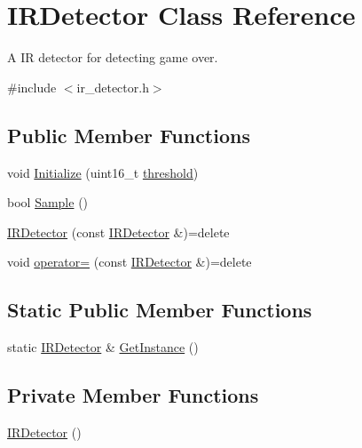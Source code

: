 \hypertarget{class_i_r_detector}{}\section{I\+R\+Detector Class Reference}
\label{class_i_r_detector}


A IR detector for detecting game over.  




{\ttfamily \#include $<$ir\+\_\+detector.\+h$>$}

\subsection*{Public Member Functions}
\begin{DoxyCompactItemize}
\item 
void \hyperlink{class_i_r_detector_a67c4bdc24a3fedcdf32dc9186c53a902}{Initialize} (uint16\+\_\+t \hyperlink{class_i_r_detector_a81b7870332a3ca41a391c95d5c3f60e4}{threshold})
\item 
bool \hyperlink{class_i_r_detector_a9b48eae026b000b3013d3e546ee3347c}{Sample} ()
\item 
\hyperlink{class_i_r_detector_a3c8810fe39422ed7ce4a98037b46adbe}{I\+R\+Detector} (const \hyperlink{class_i_r_detector}{I\+R\+Detector} \&)=delete
\item 
void \hyperlink{class_i_r_detector_af620ee70d4ea6fa4984434d89a0fb453}{operator=} (const \hyperlink{class_i_r_detector}{I\+R\+Detector} \&)=delete
\end{DoxyCompactItemize}
\subsection*{Static Public Member Functions}
\begin{DoxyCompactItemize}
\item 
static \hyperlink{class_i_r_detector}{I\+R\+Detector} \& \hyperlink{class_i_r_detector_a33500cea89076a0199e750db2fc971b9}{Get\+Instance} ()
\end{DoxyCompactItemize}
\subsection*{Private Member Functions}
\begin{DoxyCompactItemize}
\item 
\hyperlink{class_i_r_detector_a020206322c5ac6f9dee9a0c32fca37af}{I\+R\+Detector} ()
\end{DoxyCompactItemize}

